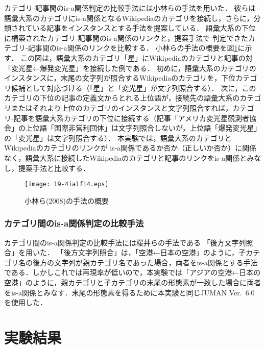 \documentclass[japanese]{jnlp_1.4}
\begin{document}
カテゴリ‐記事間のis-a関係判定の比較手法には小林ら\citeyear{Kobayashi}の手法を用いた．
彼らは語彙大系のカテゴリにis-a関係となるWikipediaのカテゴリを接続し，さらに，分類されている記事をインスタンスとする手法を提案している．
語彙大系の下位に構築されたカテゴリ‐記事間のis-a関係のリンクと，提案手法で
判定できたカテゴリ‐記事間のis-a関係のリンクを比較する．
小林ら\citeyear{Kobayashi}の手法の概要を図\ref{fig:kobayashi}に示す．
この図は，語彙大系のカテゴリ「星」にWikipediaのカテゴリと記事の対「変光星←爆発変光星」を接続した例である．
初めに，語彙大系のカテゴリのインスタンスに，末尾の文字列が照合するWikipediaのカテゴリを，下位カテゴリ候補として対応づける（「星」と「変光星」が文字列照合する）．
次に，このカテゴリの下位の記事の定義文からとれる上位語が，接続先の語彙大系のカテゴリまたはそれより上位のカテゴリのインスタンスと文字列照合すれば，カテゴリ‐記事を語彙大系カテゴリの下位に接続する（記事「アメリカ変光星観測者協会」の上位語「国際非営利団体」は文字列照合しないが，上位語「爆発変光星」の「変光星」は文字列照合する）．
本実験では，語彙大系のカテゴリとWikipediaのカテゴリのリンクが
is-a関係であるか否か（正しいか否か）に関係なく，語彙大系に接続したWikipediaのカテゴリと記事のリンクをis-a関係とみなし，提案手法と比較する．

\begin{figure}[b]
\begin{center}
\texttt{[image: 19-4ia1f14.eps]}
\end{center}
\caption{小林ら(2008)の手法の概要}
\label{fig:kobayashi}
\end{figure}


\subsubsection{カテゴリ間のis-a関係判定の比較手法}

カテゴリ間のis-a関係判定の比較手法には桜井ら\citeyear{Sakurai}の手法である
「後方文字列照合」を用いた． 
「後方文字列照合」は，「空港←日本の空港」のように，子カテゴリ名の後方の文字列が親カテゴリ名であった場合，両者をis-a関係とする手法である．しかしこれでは再現率が低いので，本実験では「アジアの空港←日本の空港」のように，親カテゴリと子カテゴリの末尾の形態素が一致した場合に両者をis-a関係とみなす．末尾の形態素を得るために本実験と同じJUMAN Ver.~6.0を使用した．



\section{実験結果}
\label{sec:kekka}
\end{document}
